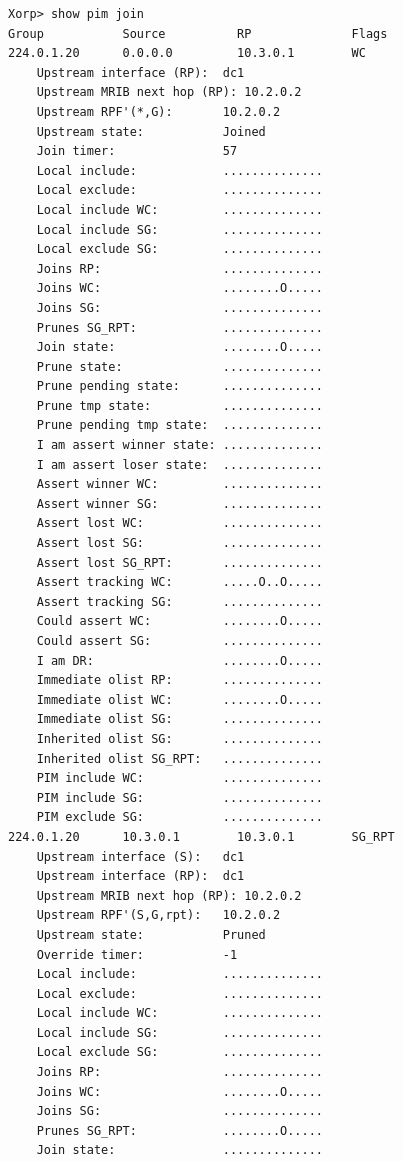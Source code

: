 \documentclass[11pt]{report}
\begin{document}
\begin{itemize}
\begin{verbatim}
Xorp> show pim join 
Group           Source          RP              Flags
224.0.1.20      0.0.0.0         10.3.0.1        WC   
    Upstream interface (RP):  dc1
    Upstream MRIB next hop (RP): 10.2.0.2
    Upstream RPF'(*,G):       10.2.0.2
    Upstream state:           Joined 
    Join timer:               57
    Local include:            ..............
    Local exclude:            ..............
    Local include WC:         ..............
    Local include SG:         ..............
    Local exclude SG:         ..............
    Joins RP:                 ..............
    Joins WC:                 ........O.....
    Joins SG:                 ..............
    Prunes SG_RPT:            ..............
    Join state:               ........O.....
    Prune state:              ..............
    Prune pending state:      ..............
    Prune tmp state:          ..............
    Prune pending tmp state:  ..............
    I am assert winner state: ..............
    I am assert loser state:  ..............
    Assert winner WC:         ..............
    Assert winner SG:         ..............
    Assert lost WC:           ..............
    Assert lost SG:           ..............
    Assert lost SG_RPT:       ..............
    Assert tracking WC:       .....O..O.....
    Assert tracking SG:       ..............
    Could assert WC:          ........O.....
    Could assert SG:          ..............
    I am DR:                  ........O.....
    Immediate olist RP:       ..............
    Immediate olist WC:       ........O.....
    Immediate olist SG:       ..............
    Inherited olist SG:       ..............
    Inherited olist SG_RPT:   ..............
    PIM include WC:           ..............
    PIM include SG:           ..............
    PIM exclude SG:           ..............
224.0.1.20      10.3.0.1        10.3.0.1        SG_RPT 
    Upstream interface (S):   dc1
    Upstream interface (RP):  dc1
    Upstream MRIB next hop (RP): 10.2.0.2
    Upstream RPF'(S,G,rpt):   10.2.0.2
    Upstream state:           Pruned 
    Override timer:           -1
    Local include:            ..............
    Local exclude:            ..............
    Local include WC:         ..............
    Local include SG:         ..............
    Local exclude SG:         ..............
    Joins RP:                 ..............
    Joins WC:                 ........O.....
    Joins SG:                 ..............
    Prunes SG_RPT:            ........O.....
    Join state:               ..............

\end{verbatim}
\end{itemize}
\end{document}

